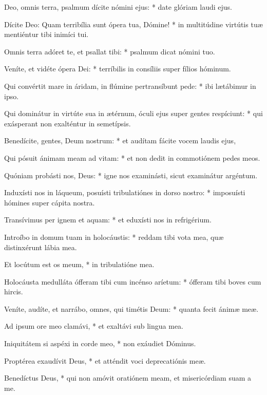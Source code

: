 \begin{psalmus}

     Deo, omnis terra, psalmum dícite nómini ejus: * date glóriam laudi ejus.

    Dícite Deo: Quam terribília sunt ópera tua, Dómine! * in multitúdine virtútis tuæ mentiéntur tibi inimíci tui.

    Omnis terra adóret te, et psallat tibi: * psalmum dicat nómini tuo.

    Veníte, et vidéte ópera Dei: * terríbilis in consíliis super fílios hóminum.

    Qui convértit mare in áridam, in flúmine pertransíbunt pede: * ibi lætábimur in ipso.

    Qui dominátur in virtúte sua in ætérnum, óculi ejus super gentes respíciunt: * qui exásperant non exalténtur in semetípsis.

    Benedícite, gentes, Deum nostrum: * et audítam fácite vocem laudis ejus,

    Qui pósuit ánimam meam ad vitam: * et non dedit in commotiónem pedes meos.

    Quóniam probásti nos, Deus: * igne nos examinásti, sicut examinátur argéntum.

    Induxísti nos in láqueum, posuísti tribulatiónes in dorso nostro: * imposuísti hómines super cápita nostra.

    Transívimus per ignem et aquam: * et eduxísti nos in refrigérium.

    Introíbo in domum tuam in holocáustis: * reddam tibi vota mea, quæ distinxérunt lábia mea.

    Et locútum est os meum, * in tribulatióne mea.

    Holocáusta medulláta ófferam tibi cum incénso aríetum: * ófferam tibi boves cum hircis.

    Veníte, audíte, et narrábo, omnes, qui timétis Deum: * quanta fecit ánimæ meæ.

    Ad ipsum ore meo clamávi, * et exaltávi sub lingua mea.

    Iniquitátem si aspéxi in corde meo, * non exáudiet Dóminus.

    Proptérea exaudívit Deus, * et atténdit voci deprecatiónis meæ.

    Benedíctus Deus, * qui non amóvit oratiónem meam, et misericórdiam suam a me.

\end{psalmus}
